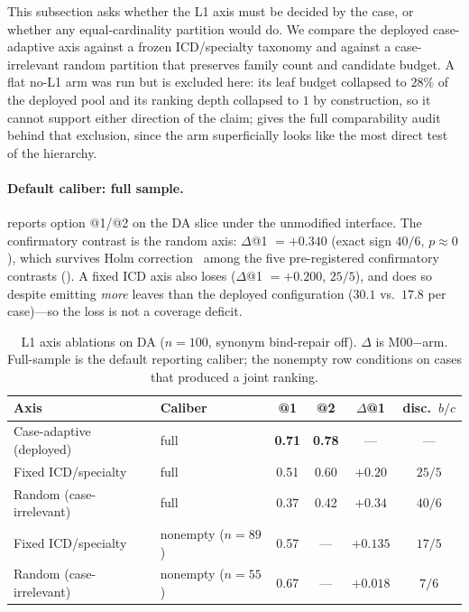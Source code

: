 This subsection asks whether the L1 axis must be decided by the case, or whether any equal-cardinality partition would do.
We compare the deployed case-adaptive axis against a frozen ICD/specialty taxonomy and against a case-irrelevant random partition that preserves family count and candidate budget.
A flat no-L1 arm was run but is excluded here: its leaf budget collapsed to $28\%$ of the deployed pool and its ranking depth collapsed to $1$ by construction, so it cannot support either direction of the claim;  gives the full comparability audit behind that exclusion, since the arm superficially looks like the most direct test of the hierarchy.

\paragraph{Default caliber: full sample.}
 reports option @1/@2 on the DA slice under the unmodified interface.
The confirmatory contrast is the random axis: $\Delta$@1 ${=}{+}0.340$ (exact sign $40/6$, $p{\approx}0$), which survives Holm correction~\cite{holm1979} among the five pre-registered confirmatory contrasts ().
A fixed ICD axis also loses ($\Delta$@1 ${=}{+}0.200$, $25/5$), and does so despite emitting \emph{more} leaves than the deployed configuration ($30.1$ vs.\ $17.8$ per case)---so the loss is not a coverage deficit.

\begin{table}[t]
\centering
\small
\caption{L1 axis ablations on DA ($n{=}100$, synonym bind-repair off). $\Delta$ is M00${-}$arm. Full-sample is the default reporting caliber; the nonempty row conditions on cases that produced a joint ranking.}
\label{tab:org-axis}
\begin{tabular}{llcccc}
\toprule
Axis & Caliber & @1 & @2 & $\Delta$@1 & disc.\ $b/c$ \\
\midrule
Case-adaptive (deployed) & full & \textbf{0.71} & \textbf{0.78} & --- & --- \\
Fixed ICD/specialty & full & 0.51 & 0.60 & $+0.20$ & $25/5$ \\
Random (case-irrelevant) & full & 0.37 & 0.42 & $+0.34$ & $40/6$ \\
\midrule
Fixed ICD/specialty & nonempty ($n{=}89$) & 0.57 & --- & $+0.135$ & $17/5$ \\
Random (case-irrelevant) & nonempty ($n{=}55$) & 0.67 & --- & $+0.018$ & $7/6$ \\
\bottomrule
\end{tabular}
\end{table}

